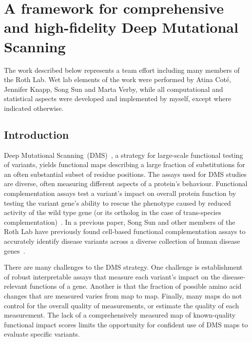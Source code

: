 

\chapter[A comprehensive high-fidelity DMS framework]{A framework for comprehensive and high-fidelity Deep Mutational Scanning}
\label{ch:data1}

The work described below represents a team effort including many members of the Roth Lab. Wet lab elements of the work were performed by Atina Cot\'e, Jennifer Knapp, Song Sun and Marta Verby, while all computational and statistical aspects were developed and implemented by myself, except where indicated otherwise.

\section{Introduction}


Deep Mutational Scanning~(DMS)~\cite{fowler_high-resolution_2010}, a strategy for large-scale functional testing of variants, yields functional maps describing a large fraction of substitutions for an often substantial subset of residue positions. The assays used for DMS studies are diverse, often measuring different aspects of a protein's behaviour. Functional complementation assays test a variant's impact on overall protein function by testing the variant gene's ability to rescue the phenotype caused by reduced activity of the wild type gene (or its ortholog in the case of trans-species complementation)~\cite{lee_complementation_1987,osborn_rescuing_2007}. In a previous paper, Song Sun and other members of the Roth Lab have previously found cell-based functional complementation assays to accurately identify disease variants across a diverse collection of human disease genes~\cite{sun_extended_2016}. 

There are many challenges to the DMS strategy.  One challenge is establishment of robust interpretable assays that measure each variant's impact on the disease-relevant functions of a gene. Another is that the fraction of possible amino acid changes that are measured varies from map to map. Finally, many maps do not control for the overall quality of measurements, or estimate the quality of each measurement. The lack of a comprehensively measured map of known-quality functional impact scores limits the opportunity for confident use of DMS maps to evaluate specific variants.

